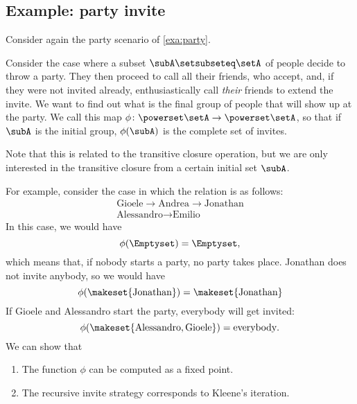 \subsection{Example: party invite}

Consider again the party scenario of \cref{exa:party}.

Consider the case where a subset $\subA \setsubseteq \setA$ of people decide to throw a party.
They then proceed to call all their friends, who accept, and,
if they were not invited already, enthusiastically call \emph{their} friends to extend the invite.
We want to find out what is the final group of people that will show up at the party.
We call this map $\phi \colon \powerset \setA \to \powerset \setA$, so that if $\subA$ is the initial group, $\phi(\subA)$ is the complete set of invites.

Note that this is related to the transitive closure operation, but we are only interested in the transitive closure from a certain initial set $\subA$.

For example, consider the case in which the relation is as follows:
\begin{align}
    \text{Gioele} \to \text{Andrea} \to \text{Jonathan} \\
    \text{Alessandro} \to \text{Emilio}
\end{align}
In this case, we would have
\begin{equation}
    \phi(\Emptyset) = \Emptyset,
\end{equation}
which means that, if nobody starts a party, no party takes place.
Jonathan does not invite anybody, so we would have
\begin{equation}
    \phi(\makeset{\text{Jonathan}}) = \makeset{\text{Jonathan}}
\end{equation}
If Gioele and Alessandro start the party, everybody will get invited:
\begin{equation}
    \phi(\makeset{\text{Alessandro}, \text{Gioele}}) = \text{everybody}.
\end{equation}
%
We can show that
\begin{enumerate}
    \item The function $\phi$ can be computed as a fixed point.
    \item The recursive invite strategy corresponds to Kleene's iteration.
\end{enumerate}

